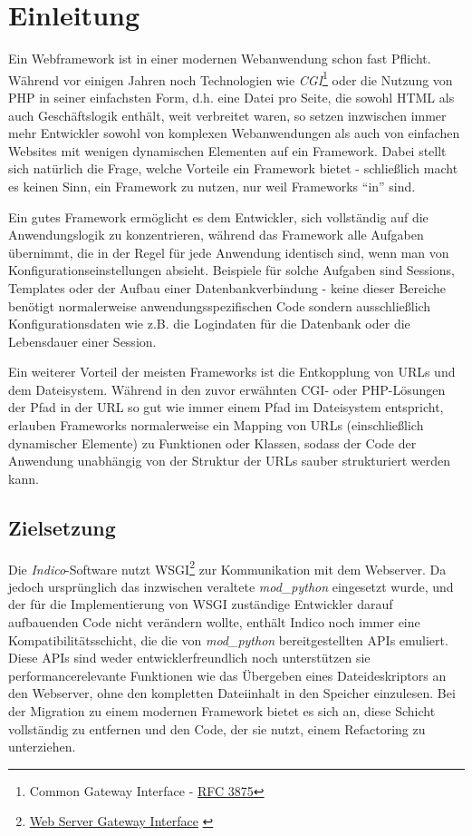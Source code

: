 \chapter{Einleitung}

Ein Webframework ist in einer modernen Webanwendung schon fast Pflicht. Während vor einigen
Jahren noch Technologien wie \emph{CGI}\footnote{Common Gateway Interface -
\href{http://www.ietf.org/rfc/rfc3875}{RFC 3875}\citep{rfc3875}} oder die Nutzung von PHP in seiner
einfachsten Form, d.h. eine Datei pro Seite, die sowohl HTML als auch Geschäftslogik enthält, weit
verbreitet waren, so setzen inzwischen immer mehr Entwickler sowohl von komplexen Webanwendungen als
auch von einfachen Websites mit wenigen dynamischen Elementen auf ein Framework. Dabei stellt sich
natürlich die Frage, welche Vorteile ein Framework bietet - schließlich macht es keinen Sinn, ein
Framework zu nutzen, nur weil Frameworks \enquote{in} sind.

Ein gutes Framework ermöglicht es dem Entwickler, sich vollständig auf die Anwendungslogik zu
konzentrieren, während das Framework alle Aufgaben übernimmt, die in der Regel für jede Anwendung
identisch sind, wenn man von Konfigurationseinstellungen absieht. Beispiele für solche Aufgaben sind
Sessions, Templates oder der Aufbau einer Datenbankverbindung - keine dieser Bereiche benötigt
normalerweise anwendungsspezifischen Code sondern ausschließlich Konfigurationsdaten wie z.B. die
Logindaten für die Datenbank oder die Lebensdauer einer Session.

Ein weiterer Vorteil der meisten Frameworks ist die Entkopplung von URLs und dem Dateisystem.
Während in den zuvor erwähnten CGI- oder PHP-Lösungen der Pfad in der URL so gut wie immer einem
Pfad im Dateisystem entspricht, erlauben Frameworks normalerweise ein Mapping von URLs
(einschließlich dynamischer Elemente) zu Funktionen oder Klassen, sodass der Code der Anwendung
unabhängig von der Struktur der URLs sauber strukturiert werden kann.


\section{Zielsetzung}

Die \emph{Indico}-Software nutzt WSGI\footnote{\href{http://www.python.org/dev/peps/pep-0333/}{Web
Server Gateway Interface} \citep{wsgi}} zur Kommunikation mit dem Webserver. Da jedoch ursprünglich
das inzwischen veraltete \emph{mod\_python} eingesetzt wurde, und der für die Implementierung von
WSGI zuständige Entwickler darauf aufbauenden Code nicht verändern wollte, enthält Indico noch immer
eine Kompatibilitätsschicht, die die von \emph{mod\_python} bereitgestellten APIs emuliert. Diese
APIs sind weder entwicklerfreundlich noch unterstützen sie performancerelevante Funktionen wie das
Übergeben eines Dateideskriptors an den Webserver, ohne den kompletten
Dateiinhalt in den Speicher einzulesen. Bei der Migration zu einem modernen Framework bietet es sich
an, diese Schicht vollständig zu entfernen und den Code, der sie nutzt, einem Refactoring zu
unterziehen.

